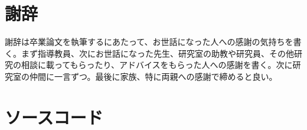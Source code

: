 \documentclass[titlepage]{jsreport}
\begin{document}
\chapter*{謝辞}

謝辞は卒業論文を執筆するにあたって、お世話になった人への感謝の気持ちを書く。まず指導教員、次にお世話になった先生、研究室の助教や研究員、その他研究の相談に載ってもらったり、アドバイスをもらった人への感謝を書く。次に研究室の仲間に一言ずつ。最後に家族、特に両親への感謝で締めると良い。

\appendix

\chapter{ソースコード}





\end{document}
